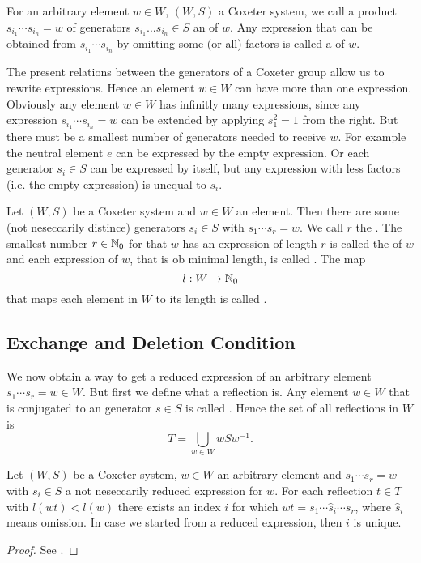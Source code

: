 \begin{defi}
	For an arbitrary element $w \in W$, $(W,S)$ a Coxeter system, we call a product $s_{i_1} \cdots s_{i_n} = w$ of generators $s_{i_1} \ldots s_{i_n} \in S$ an  of $w$. Any expression that can be obtained from $s_{i_1} \cdots s_{i_n}$ by omitting some (or all) factors is called a  of $w$.
\end{defi}

The present relations between the generators of a Coxeter group allow us to rewrite expressions. Hence an element $w \in W$ can have more than one expression. Obviously any element $w \in W$ has infinitly many expressions, since any expression $s_{i_1} \cdots s_{i_n} = w$ can be extended by applying $s_1^2 = 1$ from the right. But there must be a smallest number of generators needed to receive $w$. For example the neutral element $e$ can be expressed by the empty expression. Or each generator $s_i \in S$ can be expressed by itself, but any expression with less factors (i.e. the empty expression) is unequal to $s_i$.

\begin{defi}
	Let $(W,S)$ be a Coxeter system and $w \in W$ an element. Then there are some (not neseccarily distince) generators $s_i \in S$ with $s_1 \cdots s_r = w$. We call $r$ the . The smallest number $r \in \mathbb{N}_0$ for that $w$ has an expression of length $r$ is called the  of $w$ and each expression of $w$, that is ob minimal length, is called . The map
	$$ l : W \to \mathbb{N}_0 $$
	that maps each element in $W$ to its length is called .
\end{defi}

\subsection{Exchange and Deletion Condition}

We now obtain a way to get a reduced expression of an arbitrary element $s_1 \cdots s_r = w \in W$. But first we define what a reflection is. Any element $w \in W$ that is conjugated to an generator $s \in S$ is called . Hence the set of all reflections in $W$ is
$$ T = \bigcup_{w \in W} wSw^{-1}. $$

\begin{theo}[Strong Exchange Condition]
	Let $(W,S)$ be a Coxeter system, $w \in W$ an arbitrary element and ${s_1 \cdots s_r = w}$ with $s_i \in S$ a not neseccarily reduced expression for $w$. For each reflection $t \in T$ with $l(wt) < l(w)$ there exists an index $i$ for which $wt = s_1 \cdots \hat s_i \cdots s_r$, where $\hat s_i$ means omission. In case we started from a reduced expression, then $i$ is unique.

	\begin{proof}
		See \cite[Theorem 5.8]{humphreys:coxeter}.
	\end{proof}
\end{theo}

